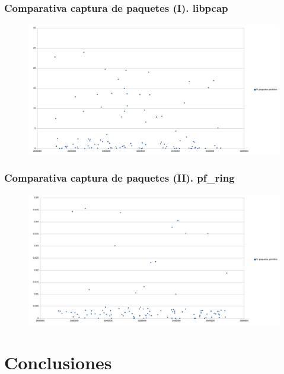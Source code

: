 \documentclass{beamer}
\begin{document}

\begin{frame}
\frametitle{Comparativa captura de paquetes (I). libpcap}

\begin{figure}[H]
	\centering
	\includegraphics[scale=0.25]{captura-libpcap-original.png}
	\label{libpcap}
\end{figure}

\end{frame}

\begin{frame}
\frametitle{Comparativa captura de paquetes (II). pf\_ring}

\begin{figure}[H]
	\centering
	\includegraphics[scale=0.25]{captura-libpcap-aware-pfring.png}
	\label{pfring}
\end{figure}

\end{frame}

\section{Conclusiones}
\end{document}
